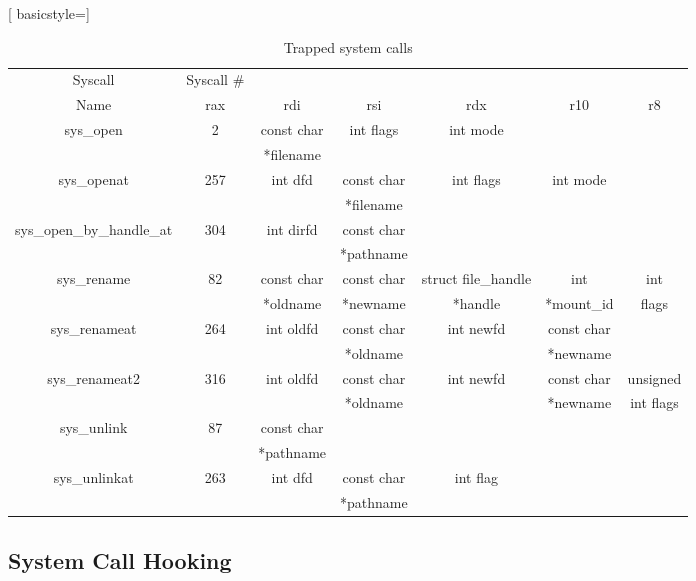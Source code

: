 \begin{table}[h]
	\centering
	\caption{Trapped system calls}[ basicstyle=\footnotesize]
	\label{tbl:prototypes}
	\begin{tabular}{ccccccc}
		\toprule
		Syscall 					& Syscall \#	&  				& 				&  						&  					&   		\\
		Name 						& rax		  	& rdi 			& rsi 			& rdx 					& r10 				& r8 		\\
		\toprule
		sys\_open 					& 2 			&	const char	&	int flags	&	int mode			&					&		 	\\
					 				&   			&	*filename	&				&						&					&		 	\\
		\hline
		sys\_openat 				& 257  			&	int dfd		&	const char 	&	int flags			&	int mode		&	 		\\
					 				&   			&				&	*filename	&						&					&		 	\\
		\hline
		sys\_open\_by\_handle\_at 	& 304  			&	int dirfd	&	const char	&						&					&		 	\\
									&   			&				&	*pathname	&						&					&		 	\\
		\hline
		sys\_rename 				& 82  			&	const char	&	const char	&	struct file\_handle	&	int 			&	int 	\\
					 				&   			&	*oldname	&	*newname	&	*handle				&	*mount\_id		&	flags	\\
		\hline
		sys\_renameat 				& 264  			&	int oldfd	&	const char 	&	int newfd			&	const char 		&	 		\\
					 				&   			&				&	*oldname	&						&	*newname		& 			\\ 
		\hline
		sys\_renameat2 				& 316  			&	int oldfd	&	const char 	&	int newfd			&	const char 		&	unsigned 		\\
									&   			&				&	*oldname	&						&	*newname		& 	int flags		\\ 
		\hline
		sys\_unlink 				& 87  			&	const char	&				&						&					&		 	\\
					 				&   			&	*pathname	&				&						&					&		 	\\ 
		\hline
		sys\_unlinkat 				& 263  			&	int dfd		&	const char	&	int flag			&					&		 	\\
					 				&   			&				&	*pathname	&						&					&		 	\\
		\bottomrule
	\end{tabular}	
\end{table}



\subsection{System Call Hooking}\label{sub:hooking}

